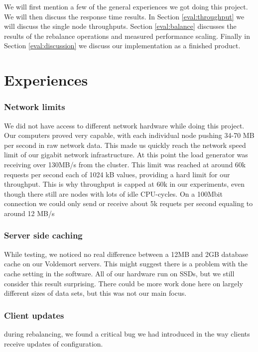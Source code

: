 
We will first mention a few of the general experiences we got doing this project.
We will then discuss the response time results. In Section \ref{eval:throughput} we will discuss the single node throughputs.
Section \ref{eval:balance} discusses the results of the rebalance operations and measured performance scaling. Finally in Section \ref{eval:discussion} we discuss our implementation as a finished product. 

\section{Experiences}
\subsubsection{Network limits}
We did not have access to different network hardware while doing this project. Our computers proved very capable, with each individual node pushing 34-70 MB per second in raw network data. This made us quickly reach the network speed limit of our gigabit network infrastructure. At this point the load generator was receiving over 130MB/s from the cluster. This limit was reached at around 60k requests per second each of 1024 kB values, providing a hard limit for our throughput. This is why throughput is capped at 60k in our experiments, even though there still are nodes with lots of idle CPU-cycles. On a 100Mbit connection we could only send or receive about 5k requets per second equaling to around 12 MB/s

\subsubsection{Server side caching}
While testing, we noticed no real difference between a 12MB and 2GB database cache on our Voldemort servers. This might suggest there is a problem with the cache setting in the software. All of our hardware run on SSDs, but we still consider this result surprising. There could be more work done here on largely different sizes of data sets, but this was not our main focus.

\subsubsection{Client updates}
during rebalancing, we found a critical bug we had introduced in the way clients receive updates of configuration.

